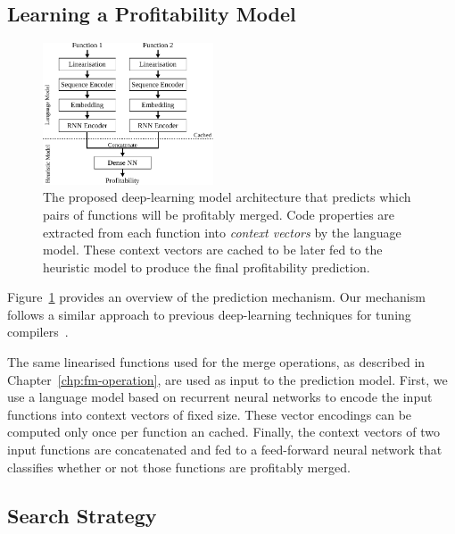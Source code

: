 \subsection{Learning a Profitability Model} \label{sec:deepprofit-model}

\begin{figure}[h]
  \centering
  \includegraphics[width=0.45\textwidth]{src/deeplearning/figs/deeplearning-architecture.pdf}
  \caption{
      The proposed deep-learning model architecture that predicts which pairs of functions will be profitably merged. Code properties are extracted from each function into \textit{context vectors} by the language model.
      These context vectors are cached to be later fed to the heuristic model to produce the final profitability prediction.}
  \label{fig:heuristic-model-architecture}
\end{figure}

Figure~\ref{fig:heuristic-model-architecture} provides an overview of the prediction mechanism.
Our mechanism follows a similar approach to previous deep-learning techniques for tuning compilers~\cite{cummins17, mendis19}.

The same linearised functions used for the merge operations, as described in Chapter~\ref{chp:fm-operation}, are used as input to the prediction model.
First, we use a language model based on recurrent neural networks to encode the input functions into context vectors of fixed size.
These vector encodings can be computed only once per function an cached.
Finally, the context vectors of two input functions are concatenated and fed to a feed-forward neural network that classifies whether or not those functions are profitably merged.

\subsection{Search Strategy}

